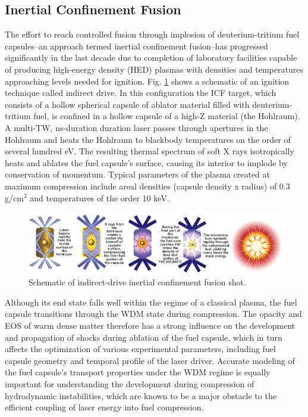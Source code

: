 \documentclass [11pt, proquest, article] {uwthesis}[2016/11/22]
\begin{document}
\subsection{Inertial Confinement Fusion}
The effort to reach controlled fusion through implosion of deuterium-tritium fuel capsules--an approach termed inertial confinement fusion--has progressed significantly in the last decade due to completion of laboratory facilities capable of producing high-energy density (HED) plasmas with densities and temperatures approaching levels needed for ignition. Fig. \ref{icf} shows a schematic of an ignition technique called indirect drive. In this configuration the ICF target, which consists of a hollow spherical capsule of ablator material filled with deuterium-tritium fuel, is confined in a hollow capsule of a high-Z material (the Hohlraum). A multi-TW, ns-duration duration laser passes through apertures in the Hohlraum and heats the Hohlraum to blackbody temperatures on the order of several hundred eV. \cite{glenzer2011demonstration}The resulting thermal spectrum of soft X rays isotropically heats and ablates the fuel capsule's surface, causing its interior to implode by conservation of momentum. Typical parameters of the plasma created at maximum compression include areal densities (capsule density x radius) of 0.3 g/cm$^2$ and temperatures of the order 10 keV. \cite{national2003frontiers, sterne2016equations}%

\begin{figure}[h] 
\caption{Schematic of indirect-drive inertial confinement fusion shot. \cite{icf}}
\label{icf}
\centering
\includegraphics[scale=0.5]{../Figures/indirect-drive.jpg}
\end{figure}

Although its end state falls well within the regime of a classical plasma, the fuel capsule transitions through the WDM state during compression. The opacity and EOS of warm dense matter therefore has a strong influence on the development and propagation of shocks during ablation of the fuel capsule, which in turn affects the optimization of various experimental parameters, including fuel capsule geometry and temporal profile of the laser driver. Accurate modeling of the fuel capsule's transport properties under the WDM regime is equally important for understanding the development during compression of hydrodynamic instabilities, which are known to be a major obstacle to the efficient coupling of laser energy into fuel compression. \cite{smalyuk2008role}
\end{document}
